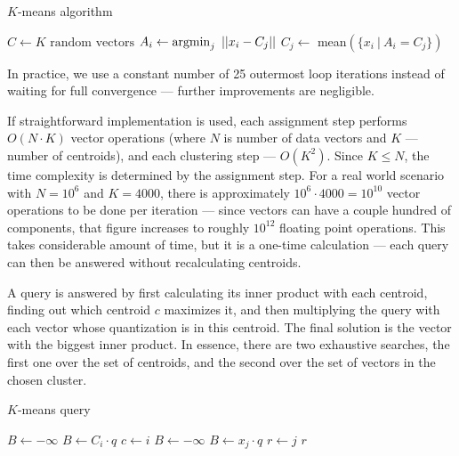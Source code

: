 \begin{algorithm}[H]
	\caption{$K$-means algorithm}
	\begin{algorithmic}
		\State $C \gets K \text{ random vectors}$
		\Repeat
				\State $A_i \gets \operatorname*{argmin}_{j}\ || x_i - C_j || $
			\EndFor
				\State $C_j \gets$ mean$(\{x_i\ |\ A_i = C_j\}) $
			\EndFor

		\State {}
	\end{algorithmic}
\end{algorithm}

In practice, we use a constant number of 25 outermost loop iterations
instead of waiting for full convergence --- further improvements are negligible.

If straightforward implementation is used, each assignment step performs
$O(N \cdot K)$ vector operations (where $N$ is number of data vectors and
$K$ --- number of centroids), and each clustering step --- $O(K^2)$. Since
$K \le N$, the time complexity is determined by the assignment step. For a real
world scenario with $N = 10^6$ and $K = 4000$, there is approximately
$10^6 \cdot 4000 = 10^{10}$ vector operations to be done per iteration --- since vectors
can have a couple hundred of components, that figure increases to roughly
$10^{12}$ floating point operations. This takes considerable amount of time,
but it is a one-time calculation --- each query can then be answered without
recalculating centroids.

A query is answered by first calculating its inner product with each centroid,
finding out which centroid $c$ maximizes it, and then multiplying the query with each vector
whose quantization is in this centroid. The final solution is the vector 
with the biggest inner product. In essence, there are two exhaustive searches,
the first one over the set of centroids, and the second over the set of vectors in the chosen cluster.

\begin{algorithm}[H]
	\caption{$K$-means query}
	\begin{algorithmic}
		\State $B \gets -\infty$
		\For{$ i < K $}
			\If{$C_i \cdot q > B$}
				\State $B \gets C_i \cdot q$
				\State $c \gets i$
			\EndIf
		\EndFor
		\State $B \gets -\infty$
		\For{$ j \in \{ j\ |\ A_j = c \} $}
			\If {$x_j \cdot q > B$}
				\State $B \gets x_j \cdot q$
				\State $r \gets j$
			\EndIf
		\EndFor
		\State \Return $r$
	\end{algorithmic}
\end{algorithm}

